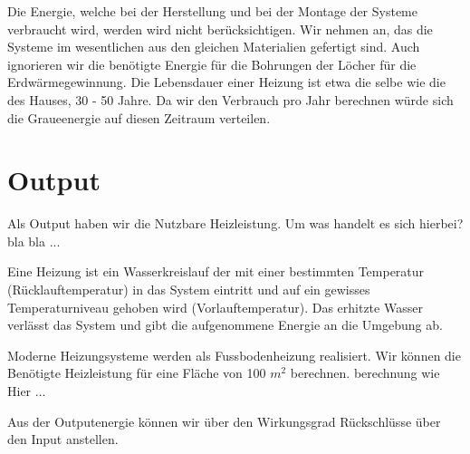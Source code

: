Die Energie, welche bei der Herstellung und bei der Montage der Systeme
verbraucht wird, werden wird nicht berücksichtigen.
Wir nehmen an, das die Systeme im wesentlichen aus den gleichen Materialien
gefertigt sind. Auch ignorieren wir die benötigte Energie für die Bohrungen der Löcher für die Erdwärmegewinnung.
Die Lebensdauer einer Heizung ist etwa die selbe wie die des Hauses, 
30 - 50 Jahre.
Da wir den Verbrauch pro Jahr berechnen würde sich die Graueenergie auf diesen
Zeitraum verteilen.

\section{Output}

Als Output haben wir die Nutzbare Heizleistung.
Um was handelt es sich hierbei?
bla bla ...

Eine Heizung ist ein Wasserkreislauf der mit einer bestimmten Temperatur
(Rücklauftemperatur) in das System eintritt und auf ein gewisses Temperaturniveau
gehoben wird (Vorlauftemperatur). Das erhitzte Wasser verlässt das System und
gibt die aufgenommene Energie an die Umgebung ab.
 
Moderne Heizungsysteme werden als Fussbodenheizung realisiert.
Wir können die Benötigte Heizleistung für eine Fläche von 100 $m^2$
berechnen.
berechnung wie Hier ...

Aus der Outputenergie können wir über den Wirkungsgrad Rückschlüsse über
den Input anstellen.










